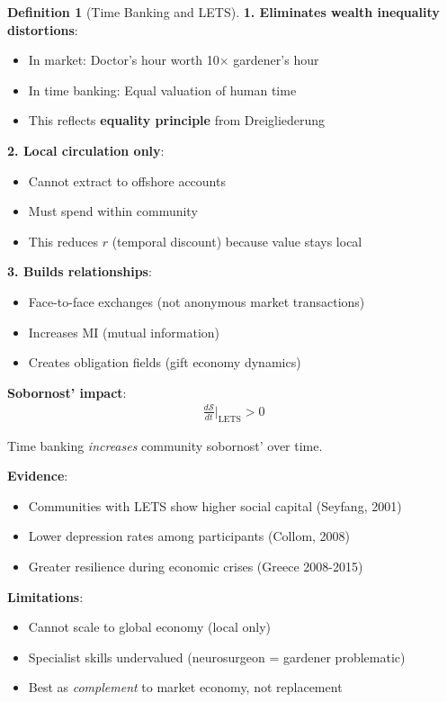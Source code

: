 \documentclass[11pt,a4paper]{article}
\theoremstyle{definition}
\newtheorem{definition}{Definition}[section]
\theoremstyle{remark}
\begin{document}
\begin{enumerate}
\begin{definition}[Time Banking and LETS]
\textbf{1. Eliminates wealth inequality distortions}:
\begin{itemize}
    \item In market: Doctor's hour worth 10× gardener's hour
    \item In time banking: Equal valuation of human time
    \item This reflects \textbf{equality principle} from Dreigliederung
\end{itemize}

\textbf{2. Local circulation only}:
\begin{itemize}
    \item Cannot extract to offshore accounts
    \item Must spend within community
    \item This reduces \(r\) (temporal discount) because value stays local
\end{itemize}

\textbf{3. Builds relationships}:
\begin{itemize}
    \item Face-to-face exchanges (not anonymous market transactions)
    \item Increases \(\text{MI}\) (mutual information)
    \item Creates obligation fields (gift economy dynamics)
\end{itemize}

\textbf{Sobornost' impact}:
\begin{align}
\frac{d\mathcal{S}}{dt}\bigg|_{\text{LETS}} > 0
\end{align}

Time banking \textit{increases} community sobornost' over time.

\textbf{Evidence}:
\begin{itemize}
    \item Communities with LETS show higher social capital (Seyfang, 2001)
    \item Lower depression rates among participants (Collom, 2008)
    \item Greater resilience during economic crises (Greece 2008-2015)
\end{itemize}

\textbf{Limitations}:
\begin{itemize}
    \item Cannot scale to global economy (local only)
    \item Specialist skills undervalued (neurosurgeon = gardener problematic)
    \item Best as \textit{complement} to market economy, not replacement
\end{itemize}
\end{definition}


\end{enumerate}
\end{document}
